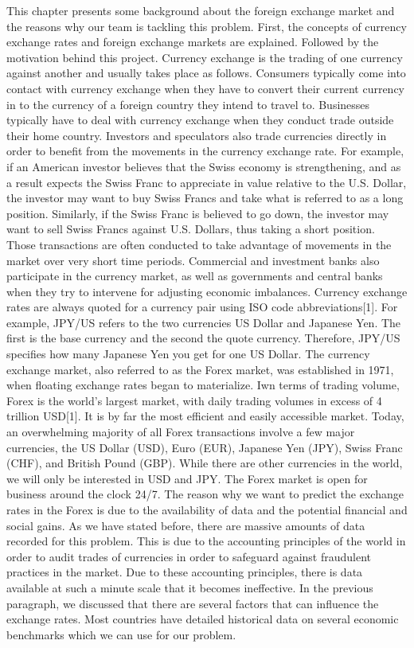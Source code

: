 \documentclass[twoside]{article}
\begin{document}
This chapter presents some background about the foreign exchange market and the reasons why our team is tackling this problem. First, the concepts of currency exchange rates and foreign exchange markets are explained. Followed by the motivation behind this project. 
Currency exchange is the trading of one currency against another and usually takes place as follows. Consumers typically come into contact with currency exchange when they have to convert their current currency in to the currency of a foreign country they intend to travel to. Businesses typically have to deal with currency exchange when they conduct trade outside their home country. Investors and speculators also trade currencies directly in order to benefit from the movements in the currency exchange rate. For example, if an American investor believes that the Swiss economy is strengthening, and as a result expects the Swiss Franc to appreciate in value relative to the U.S. Dollar, the investor may want to buy Swiss Francs and take what is referred to as a long position. Similarly, if the Swiss Franc is believed to go down, the investor may want to sell Swiss Francs against U.S. Dollars, thus taking a short position. Those transactions are often conducted to take advantage of movements in the market over very short time periods. Commercial and investment banks also participate in the currency market, as well as governments and central banks when they try to intervene for adjusting economic imbalances. Currency exchange rates are always quoted for a currency pair using ISO code abbreviations[1]. For example, JPY/US refers to the two currencies US Dollar and Japanese Yen. The first is the base currency and the second the quote currency. 
Therefore, JPY/US specifies how many Japanese Yen you get for one US Dollar. 
The currency exchange market, also referred to as the Forex market, was established in 1971, when floating exchange rates began to materialize. Iwn terms of trading volume, Forex is the world’s largest market, with daily trading volumes in excess of 4 trillion USD[1]. It is by far the most efficient and easily accessible market. Today, an overwhelming majority of all Forex transactions involve a few major currencies, the US Dollar (USD), Euro (EUR), Japanese Yen (JPY), Swiss Franc (CHF), and British Pound (GBP). While there are other currencies in the world, we will only be interested in USD and JPY. The Forex market is open for business around the clock 24/7. 
The reason why we want to predict the exchange rates in the Forex is due to the availability of data and the potential financial and social gains. As we have stated before, there are massive amounts of data recorded for this problem. This is due to the accounting principles of the world in order to audit trades of currencies in order to safeguard against fraudulent practices in the market. Due to these accounting principles, there is data available at such a minute scale that it becomes ineffective. In the previous paragraph, we discussed that there are several factors that can influence the exchange rates. Most countries have detailed historical data on several economic benchmarks which we can use for our problem. 
\end{document}
